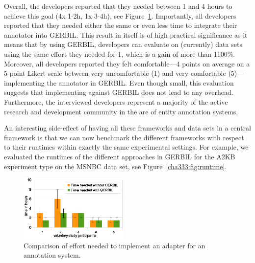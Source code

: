 Overall, the developers reported that they needed between 1 and 4 hours to achieve this goal (4x 1-2h, 1x 3-4h), see Figure~\ref{cha333:fig:comparedTime}.
Importantly, all developers reported that they needed either the same or even less time to integrate their annotator into GERBIL.
This result in itself is of high practical significance as it means that by using GERBIL, developers can evaluate on (currently) \overalldatasets data sets using the same effort they needed for 1, which is a gain of more than 1100\%.
Moreover, all developers reported they felt comfortable---4 points on average on a 5-point Likert scale between very uncomfortable (1) and very comfortable (5)---implementing the annotator in GERBIL.
Even though small, this evaluation suggests that implementing against GERBIL does not lead to any overhead.
Furthermore, the interviewed developers represent a majority of the active research and development community in the are of entity annotation systems.

An interesting side-effect of having all these frameworks and data sets in a central framework is that we can now benchmark the different frameworks with respect to their runtimes within exactly the same experimental settings. 
For example, we evaluated the runtimes of the different approach\-es in GERBIL for the A2KB experiment type on the MSNBC data set, see Figure~\ref{cha333:fig:runtime}.


\begin{figure}[ht]
\centering
\includegraphics[width=0.48\textwidth]{chapter_three/benchmarking/ESWC_GERBIL_demo/user_study.eps}
\caption{Comparison of effort needed to implement an adapter for an annotation system.}
\label{cha333:fig:comparedTime}
\end{figure}


